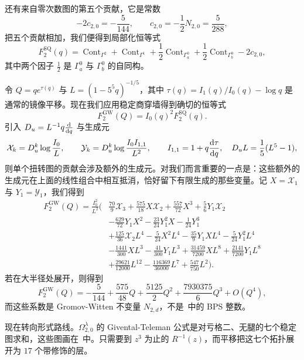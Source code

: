 \documentclass{amsart}
\theoremstyle{definition}
\theoremstyle{remark}
\theoremstyle{plain}
\theoremstyle{definition}
\theoremstyle{remark}
\newcommand{\mc}[1]{\mathcal{#1}}
\newcommand{\mr}[1]{\mathrm{#1}}
\newcommand{\1}{\mathbf{1}}
\newcommand{\2}{\mathbf{2}}
\newcommand{\3}{\mathbf{3}}
\DeclareMathOperator{\Cont}{Cont}
\begin{document}
还有来自零次数图的第五个贡献，它是常数
\[ -2c_{2,0} = -\frac{5}{144}, \qquad c_{2,0} = -\frac{1}{2}N_{2,0} = \frac{5}{288}, \]
把五个贡献相加，我们便得到局部化恒等式
\[ F_2^{\mr{SQ}}(q) = \Cont_{\Gamma^2} + \Cont_{\Gamma^1} + \frac{1}{2}\Cont_{\Gamma_a^0} + \frac{1}{2}\Cont_{\Gamma_b^0} - 2c_{2,0}, \]
其中两个因子 \(\frac{1}{2}\) 是 \(\Gamma_a^0\) 与 \(\Gamma_b^0\) 的自同构。

令 \(Q = qe^{\tau(q)}\) 与 \(L = (1-5^5q)^{-1/5}\)，其中 \(\tau(q) = I_1(q)/I_0(q) - \log q\) 是通常的镜像平移。现在我们应用稳定商穿墙得到确切的恒等式
\[ F_2^{\mr{GW}}(Q) = I_0(q)^2 F_2^{\mr{SQ}}(q). \]
引入 \(D_u = L^{-1}q\odv{}{q}\) 与生成元
\[ \mc{X}_k = D_u^k \log \frac{I_0}{L}, \qquad \mc{Y}_k = D_u^k \log \frac{I_0I_{1,1}}{L^2}, \qquad I_{1,1} = 1 + q \odv{\tau}{q}, \quad D_u L = \frac{1}{5}(L^5-1), \]
则单个扭转图的贡献会涉及额外的生成元。对我们而言重要的一点是：这些额外的生成元在上面的线性组合中相互抵消，恰好留下有限生成的那些变量。记 \(X = \mc{X}_1\) 与 \(Y_1 = \mc{Y}_1\)，我们得到
\begin{align*}
    F^{\mr{GW}}_2(Q) = \frac{I_0^2}{L^2}\Big(&\frac{70}{9}\mc{X}_3 + \frac{575}{18}X\mc{X}_2 + \frac{557}{72}X^3 + \frac{5}{6}Y_1\mc{X}_2 \\
    &- \frac{629}{72}Y_1X^2 - \frac{23}{24}Y_1^2 X - \frac{1}{24}Y_1^3 \\
    &+ \frac{125}{36}\mc{X}_2 L^4 - \frac{5}{24}X^2L^4 - \frac{35}{9}Y_1XL^4 - \frac{5}{24}Y_1^2L^4 \\
    &- \frac{1441}{300}XL^3 - \frac{41}{300}Y_1L^3 + \frac{31459}{7200}XL^8 + \frac{2141}{7200}Y_1L^8 \\
    &+ \frac{29621}{12000}L^{12} - \frac{116369}{36000}L^7 + \frac{547}{750}L^2\Big).
\end{align*}
若在大半径处展开，则得到
\[ F_2^{\mr{GW}}(Q) = -\frac{5}{144} + \frac{575}{48}Q + \frac{5125}{2}Q^2 + \frac{7930375}{6}Q^3 + O(Q^4), \]
而这些系数是 Gromov-Witten 不变量 \(N_{2,d}\)，不是~中的 BPS 整数。

现在转向形式路线。\(\Omega^{\lambda}_{2,0}\) 的 Givental-Teleman 公式是对亏格二、无腿的七个稳定图求和，这些图画在~中。只需要到 \(z^3\) 为止的 \(R^{-1}(z)\)，而平移把这七个拓扑展开为 \(17\) 个带修饰的层。
\end{document}
